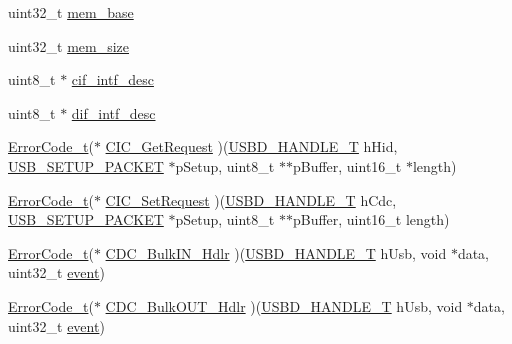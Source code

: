 \begin{DoxyCompactItemize}
\item 
uint32\+\_\+t \hyperlink{struct_u_s_b_d___c_d_c___i_n_i_t___p_a_r_a_m_a2d9d28e9450cf152c1826a3669015014}{mem\+\_\+base}
\item 
uint32\+\_\+t \hyperlink{struct_u_s_b_d___c_d_c___i_n_i_t___p_a_r_a_m_a3616334a22f3ae9a30029f572920b9f4}{mem\+\_\+size}
\item 
uint8\+\_\+t $\ast$ \hyperlink{struct_u_s_b_d___c_d_c___i_n_i_t___p_a_r_a_m_a84c3d40976a44e3dde322e98480776a3}{cif\+\_\+intf\+\_\+desc}
\item 
uint8\+\_\+t $\ast$ \hyperlink{struct_u_s_b_d___c_d_c___i_n_i_t___p_a_r_a_m_a473ac609a0fe0a78826b20a947de7df1}{dif\+\_\+intf\+\_\+desc}
\item 
\hyperlink{error_8h_a905255056c349318139d94aa4523d516}{Error\+Code\+\_\+t}($\ast$ \hyperlink{struct_u_s_b_d___c_d_c___i_n_i_t___p_a_r_a_m_a7393ec7442baaa058bed1384a9fc6fa6}{C\+I\+C\+\_\+\+Get\+Request} )(\hyperlink{group___u_s_b_d___core_gafdbb2204d929cb9d75736bd2b42342ac}{U\+S\+B\+D\+\_\+\+H\+A\+N\+D\+L\+E\+\_\+T} h\+Hid, \hyperlink{group___u_s_b_d___core_ga4a940f7627cc7e9f0bb693cc0fce8637}{U\+S\+B\+\_\+\+S\+E\+T\+U\+P\+\_\+\+P\+A\+C\+K\+ET} $\ast$p\+Setup, uint8\+\_\+t $\ast$$\ast$p\+Buffer, uint16\+\_\+t $\ast$length)
\item 
\hyperlink{error_8h_a905255056c349318139d94aa4523d516}{Error\+Code\+\_\+t}($\ast$ \hyperlink{struct_u_s_b_d___c_d_c___i_n_i_t___p_a_r_a_m_a828e304674e2d4d7c449b9ac7025cb5d}{C\+I\+C\+\_\+\+Set\+Request} )(\hyperlink{group___u_s_b_d___core_gafdbb2204d929cb9d75736bd2b42342ac}{U\+S\+B\+D\+\_\+\+H\+A\+N\+D\+L\+E\+\_\+T} h\+Cdc, \hyperlink{group___u_s_b_d___core_ga4a940f7627cc7e9f0bb693cc0fce8637}{U\+S\+B\+\_\+\+S\+E\+T\+U\+P\+\_\+\+P\+A\+C\+K\+ET} $\ast$p\+Setup, uint8\+\_\+t $\ast$$\ast$p\+Buffer, uint16\+\_\+t length)
\item 
\hyperlink{error_8h_a905255056c349318139d94aa4523d516}{Error\+Code\+\_\+t}($\ast$ \hyperlink{struct_u_s_b_d___c_d_c___i_n_i_t___p_a_r_a_m_ac6a85d108817d7ba7e56934df8c80b81}{C\+D\+C\+\_\+\+Bulk\+I\+N\+\_\+\+Hdlr} )(\hyperlink{group___u_s_b_d___core_gafdbb2204d929cb9d75736bd2b42342ac}{U\+S\+B\+D\+\_\+\+H\+A\+N\+D\+L\+E\+\_\+T} h\+Usb, void $\ast$data, uint32\+\_\+t \hyperlink{structevent}{event})
\item 
\hyperlink{error_8h_a905255056c349318139d94aa4523d516}{Error\+Code\+\_\+t}($\ast$ \hyperlink{struct_u_s_b_d___c_d_c___i_n_i_t___p_a_r_a_m_a655ea6e4382a762a37073972e84206f3}{C\+D\+C\+\_\+\+Bulk\+O\+U\+T\+\_\+\+Hdlr} )(\hyperlink{group___u_s_b_d___core_gafdbb2204d929cb9d75736bd2b42342ac}{U\+S\+B\+D\+\_\+\+H\+A\+N\+D\+L\+E\+\_\+T} h\+Usb, void $\ast$data, uint32\+\_\+t \hyperlink{structevent}{event})

\end{DoxyCompactItemize}
